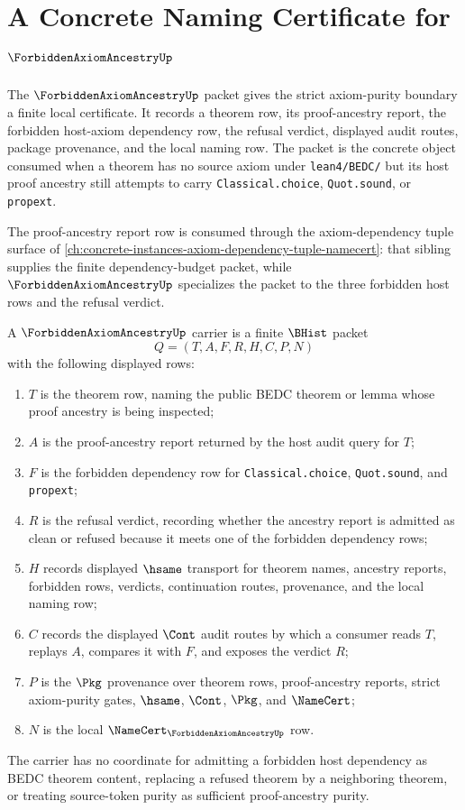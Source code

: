 \chapter{A Concrete Naming Certificate for $\ForbiddenAxiomAncestryUp$}
\label{ch:concrete-instances-forbidden-axiom-ancestry-namecert}

The $\ForbiddenAxiomAncestryUp$ packet gives the strict axiom-purity boundary a finite local certificate. It records a theorem row, its proof-ancestry report, the forbidden host-axiom dependency row, the refusal verdict, displayed audit routes, package provenance, and the local naming row. The packet is the concrete object consumed when a theorem has no source axiom under \texttt{lean4/BEDC/} but its host proof ancestry still attempts to carry \texttt{Classical.choice}, \texttt{Quot.sound}, or \texttt{propext}.

The proof-ancestry report row is consumed through the axiom-dependency tuple surface of \autoref{ch:concrete-instances-axiom-dependency-tuple-namecert}: that sibling supplies the finite dependency-budget packet, while $\ForbiddenAxiomAncestryUp$ specializes the packet to the three forbidden host rows and the refusal verdict.

\begin{definition}
\label{def:forbidden-axiom-ancestry-carrier}
A $\ForbiddenAxiomAncestryUp$ carrier is a finite $\BHist$ packet
$$
Q=(T,A,F,R,H,C,P,N)
$$
with the following displayed rows:
\begin{enumerate}
\item $T$ is the theorem row, naming the public BEDC theorem or lemma whose proof ancestry is being inspected;
\item $A$ is the proof-ancestry report returned by the host audit query for $T$;
\item $F$ is the forbidden dependency row for \texttt{Classical.choice}, \texttt{Quot.sound}, and \texttt{propext};
\item $R$ is the refusal verdict, recording whether the ancestry report is admitted as clean or refused because it meets one of the forbidden dependency rows;
\item $H$ records displayed $\hsame$ transport for theorem names, ancestry reports, forbidden rows, verdicts, continuation routes, provenance, and the local naming row;
\item $C$ records the displayed $\Cont$ audit routes by which a consumer reads $T$, replays $A$, compares it with $F$, and exposes the verdict $R$;
\item $P$ is the $\Pkg$ provenance over theorem rows, proof-ancestry reports, strict axiom-purity gates, $\hsame$, $\Cont$, $\Pkg$, and $\NameCert$;
\item $N$ is the local $\NameCert_{\ForbiddenAxiomAncestryUp}$ row.
\end{enumerate}
The carrier has no coordinate for admitting a forbidden host dependency as BEDC theorem content, replacing a refused theorem by a neighboring theorem, or treating source-token purity as sufficient proof-ancestry purity.
\end{definition}


